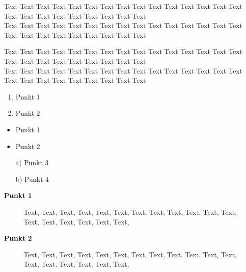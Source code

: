 
Text Text Text Text Text Text Text Text Text Text Text Text Text Text Text Text Text Text Text Text Text Text Text Text \\
Text Text Text Text Text Text Text Text Text Text Text Text Text Text Text Text Text Text Text Text Text Text Text Text 

Text Text Text Text Text Text Text Text Text Text Text Text Text Text Text Text Text Text Text Text Text Text Text Text \\

Text Text Text Text Text Text Text Text Text Text Text Text Text Text Text Text Text Text Text Text Text Text Text Text 

\begin{enumerate}
    \item Punkt 1 
    \item Punkt 2 
\end{enumerate}

\begin{itemize}
    \item Punkt 1
    \item Punkt 2
    \item[a)] Punkt 3
    \item[b)] Punkt 4
\end{itemize}

\begin{description}
    \item[\textbf{Punkt 1}] Text, Text, Text, Text, Text, Text, Text, Text, Text, Text, Text, Text, Text, Text, Text, Text, Text, Text, 
    \item[\textbf{Punkt 2}] Text, Text, Text, Text, Text, Text, Text, Text, Text, Text, Text, Text, Text, Text, Text, Text, Text, Text, 
\end{description}
